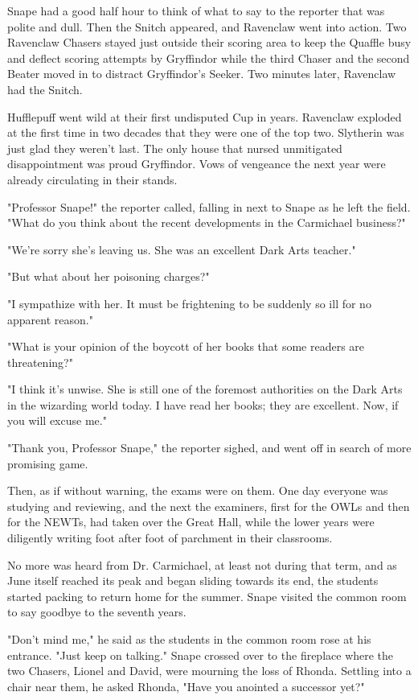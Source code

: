 Snape had a good half hour to think of what to say to the reporter that was polite and dull. Then the Snitch appeared, and Ravenclaw went into action. Two Ravenclaw Chasers stayed just outside their scoring area to keep the Quaffle busy and deflect scoring attempts by Gryffindor while the third Chaser and the second Beater moved in to distract Gryffindor's Seeker. Two minutes later, Ravenclaw had the Snitch.

Hufflepuff went wild at their first undisputed Cup in years. Ravenclaw exploded at the first time in two decades that they were one of the top two. Slytherin was just glad they weren't last. The only house that nursed unmitigated disappointment was proud Gryffindor. Vows of vengeance the next year were already circulating in their stands.

"Professor Snape!" the reporter called, falling in next to Snape as he left the field. "What do you think about the recent developments in the Carmichael business?"

"We're sorry she's leaving us. She was an excellent Dark Arts teacher."

"But what about her poisoning charges?"

"I sympathize with her. It must be frightening to be suddenly so ill for no apparent reason."

"What is your opinion of the boycott of her books that some readers are threatening?"

"I think it's unwise. She is still one of the foremost authorities on the Dark Arts in the wizarding world today. I have read her books; they are excellent. Now, if you will excuse me."

"Thank you, Professor Snape," the reporter sighed, and went off in search of more promising game.

Then, as if without warning, the exams were on them. One day everyone was studying and reviewing, and the next the examiners, first for the OWLs and then for the NEWTs, had taken over the Great Hall, while the lower years were diligently writing foot after foot of parchment in their classrooms.

No more was heard from Dr. Carmichael, at least not during that term, and as June itself reached its peak and began sliding towards its end, the students started packing to return home for the summer. Snape visited the common room to say goodbye to the seventh years.

"Don't mind me," he said as the students in the common room rose at his entrance. "Just keep on talking." Snape crossed over to the fireplace where the two Chasers, Lionel and David, were mourning the loss of Rhonda. Settling into a chair near them, he asked Rhonda, "Have you anointed a successor yet?"

